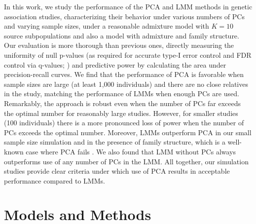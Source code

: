 \documentclass[11pt]{article}
\begin{document}
In this work, we study the performance of the PCA and LMM methods in genetic association studies, characterizing their behavior under various numbers of PCs and varying sample sizes, under a reasonable admixture model with $K = 10$ source subpopulations and also a model with admixture and family structure.
Our evaluation is more thorough than previous ones, directly measuring the uniformity of null p-values (as required for accurate type-I error control and FDR control via q-values; \cite{storey_positive_2003, storey_statistical_2003}) and predictive power by calculating the area under precision-recall curves.
We find that the performance of PCA is favorable when sample sizes are large (at least 1,000 individuals) and there are no close relatives in the study, matching the performance of LMMs when enough PCs are used.
Remarkably, the approach is robust even when the number of PCs far exceeds the optimal number for reasonably large studies.
However, for smaller studies (100 individuals) there is a more pronounced loss of power when the number of PCs exceeds the optimal number.
Moreover, LMMs outperform PCA in our small sample size simulation and in the presence of family structure, which is a well-known case where PCA fails \citep{patterson_population_2006, price_new_2010}.
We also found that LMM without PCs always outperforms use of any number of PCs in the LMM.
All together, our simulation studies provide clear criteria under which use of PCA results in acceptable performance compared to LMMs.


\section{Models and Methods}
\end{document}
